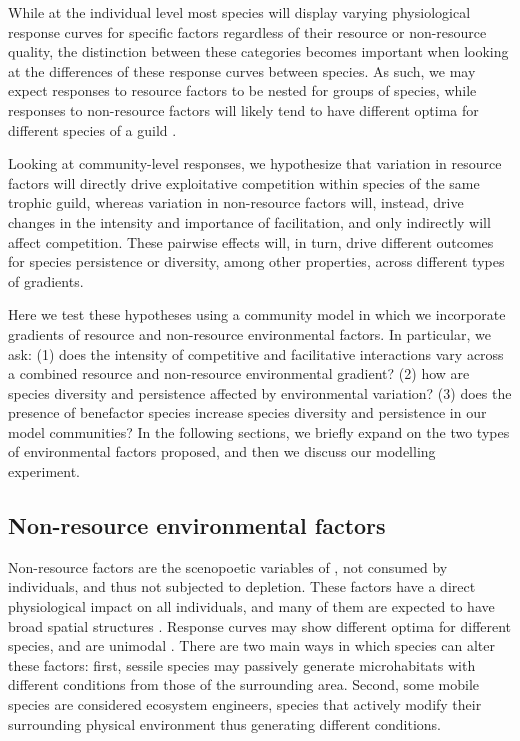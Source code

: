 While at the individual level most species will display varying physiological response curves for specific factors regardless of their resource or non-resource quality, the distinction between these categories becomes important when looking at the differences of these response curves between species. As such, we may expect responses to resource factors to be nested for groups of species, while responses to non-resource factors will likely tend to have different optima for different species of a guild \citep{Austin1990}.

Looking at community-level responses, we hypothesize that variation in resource factors will directly drive exploitative competition within species of the same trophic guild, whereas variation in non-resource factors will, instead, drive changes in the intensity and importance of facilitation, and only indirectly will affect competition. These pairwise effects will, in turn, drive different outcomes for species persistence or diversity, among other properties, across different types of gradients.

Here we test these hypotheses using a community model in which we incorporate gradients of resource and non-resource environmental factors. In particular, we ask: (1) does the intensity of competitive and facilitative interactions vary across a combined resource and non-resource environmental gradient? (2) how are species diversity and persistence affected by environmental variation? (3) does the presence of benefactor species increase species diversity and persistence in our model communities? In the following sections, we briefly expand on the two types of environmental factors proposed, and then we discuss our modelling experiment.

\subsection{Non-resource environmental factors}

Non-resource factors are the scenopoetic variables of \cite{Hutchinson1978}, not consumed by individuals, and thus not subjected to depletion. These factors have a direct physiological impact on all individuals, and many of them are expected to have broad spatial structures \citep{Soberon2007}. Response curves may show different optima for different species, and are unimodal \citep{Austin1990}. There are two main ways in which species can alter these factors: first, sessile species may passively generate microhabitats with different conditions from those of the surrounding area. Second, some mobile species are considered ecosystem engineers, species that actively modify their surrounding physical environment thus generating different conditions.

